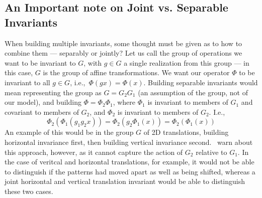 \subsection{An Important note on Joint vs. Separable Invariants}
  When building multiple invariants, some thought must be given as to how to
  combine them --- separably or jointly? Let us call the group of operations we
  want to be invariant to $G$, with $g \in G$ a single realization from this
  group --- in this case, $G$ is the group of affine transformations. We want
  our operator $\Phi$ to be invariant to all  $g \in G$, i.e.,\ $\Phi(gx)
  = \Phi(x)$. Building separable invariants would mean representing the group
  as $G=G_2G_1$ (an assumption of the group, not of our model), and building
  $\Phi = \Phi_2 \Phi_1$, where $\Phi_1$ is invariant to members of $G_1$ and
  covariant to members of $G_2$, and $\Phi_2$ is invariant to members of $G_2$.
  I.e.,\
  \begin{equation}
    \Phi_2(\Phi_1(g_1g_2x)) = \Phi_2(g_2\Phi_1(x)) = \Phi_2(\Phi_1(x))
  \end{equation}
  An example of this would be in the group $G$ of 2D translations, building
  horizontal invariance first, then building vertical invariance second.
  \Bruna\ warn about this approach, however, as it cannot capture the action
  of $G_2$ relative to $G_1$. In the case of veritcal and horizontal
  translations, for example, it would not be able to distinguish if the
  patterns had moved apart as well as being shifted, whereas a joint
  horizontal and vertical translation invariant would be able to distinguish
  these two cases.


